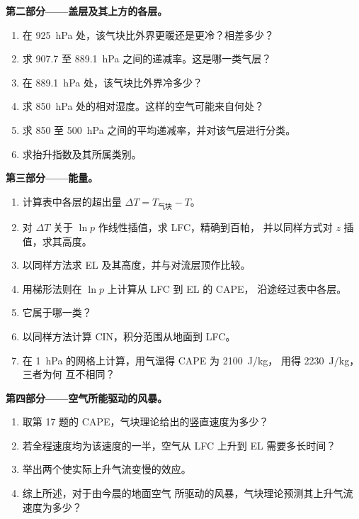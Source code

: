\begin{problem}
\medskip\noindent\textbf{第二部分——盖层及其上方的各层。}
\begin{enumerate}[resume]
  \item 在 \qty{925}{hPa} 处，该气块比外界更暖还是更冷？相差多少？
  \item 求 907.7 至 \qty{889.1}{hPa} 之间的递减率。这是哪一类气层？
  \item 在 \qty{889.1}{hPa} 处，该气块比外界冷多少？
  \item 求 \qty{850}{hPa} 处的相对湿度。这样的空气可能来自何处？
  \item 求 850 至 \qty{500}{hPa} 之间的平均递减率，并对该气层进行分类。
  \item 求抬升指数及其所属类别。
\end{enumerate}

\medskip\noindent\textbf{第三部分——能量。}
\begin{enumerate}[resume]
  \item 计算表中各层的超出量 $\Delta T = T_{\text{气块}} - T$。
  \item 对 $\Delta T$ 关于 $\ln p$ 作线性插值，求 LFC，精确到百帕，
        并以同样方式对 $z$ 插值，求其高度。
  \item 以同样方法求 EL 及其高度，并与对流层顶作比较。
  \item 用梯形法则在 $\ln p$ 上计算从 LFC 到 EL 的 CAPE，
        沿途经过表中各层。
  \item 它属于哪一类？
  \item 以同样方法计算 CIN，积分范围从地面到 LFC。
  \item 在 \qty{1}{hPa} 的网格上计算，用气温得 CAPE 为 \qty{2100}{J/kg}，
        用得 \qty{2230}{J/kg}，三者为何
        互不相同？
\end{enumerate}

\medskip\noindent\textbf{第四部分——空气所能驱动的风暴。}
\begin{enumerate}[resume]
  \item 取第 17 题的 CAPE，气块理论给出的竖直速度为多少？
  \item 若全程速度均为该速度的一半，空气从 LFC 上升到 EL 需要多长时间？
  \item 举出两个使实际上升气流变慢的效应。
  \item 综上所述，对于由今晨的地面空气
        所驱动的风暴，气块理论预测其上升气流速度为多少？
\end{enumerate}
\end{problem}
